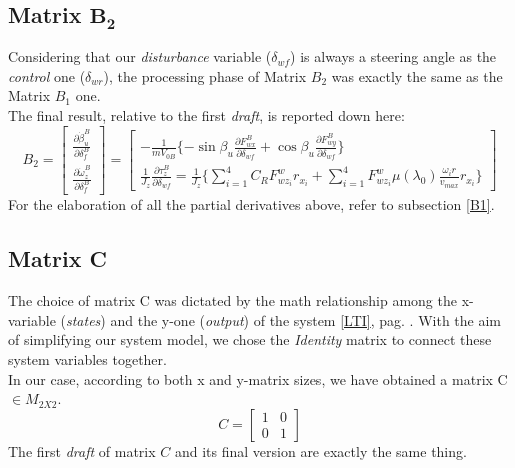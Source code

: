 \subsection{Matrix $\mathbf{B_{2}}$}
	Considering that our \textit{disturbance} variable ($\delta_{wf}$) is always a steering angle as the \textit{control} one ($\delta_{wr}$), the processing phase of Matrix $B_{2}$ was exactly the same as the Matrix $B_{1}$ one. \\ The final result, relative to the first \textit{draft}, is reported down here:
		\begin{equation}
			B_{2}=
			\begin{bmatrix}
				\frac{\partial\dot{\beta}_{u}^{B}}{\partial\delta_{f}^{B}} \\
				\frac{\partial\dot{\omega}_{z}^{B}}{\partial\delta_{f}^{B}}
			\end{bmatrix} =
			\begin{bmatrix}
				-\frac{1}{mV_{0B}}\{-\sin\beta_{u}\frac{\partial F_{wx}^{B}}{\partial \delta_{wf}} + \cos\beta_{u}\frac{\partial F_{wy}^{B}}{\partial \delta_{wf}}\} \\
				\frac{1}{J_{z}} \frac{\partial \tau_{z}^{B}}{\partial\delta_{wf}} = \frac{1}{J_{z}} \{ \sum\limits_{i=1}^4 C_{R}F_{wz_{i}}^{w} r_{x_{i}} + \sum\limits_{i=1}^4 F_{wz_{i}}^{w} \mu(\lambda_{0}) \frac{\omega_{i} r}{v_{max}}r_{x_{i}} \}
			\end{bmatrix}
		\end{equation}
	For the elaboration of all the partial derivatives above, refer to subsection \ref{B1}.
\subsection{Matrix C}
	The choice of matrix C was dictated by the math relationship among the x-variable (\textit{states}) and the y-one (\textit{output}) of the system \ref{LTI}, pag. \pageref{LTI}. With the aim of simplifying our system model, we chose the \textit{Identity} matrix to connect these system variables together. \\ In our case, according to both x and y-matrix sizes, we have obtained a matrix C $\in M_{2X2}$.
		\begin{equation}
			C =
			\begin{bmatrix}
				1 & 0 \\
				0 & 1
			\end{bmatrix}
		\end{equation}
	The first \textit{draft} of matrix $C$ and its final version are exactly the same thing.
